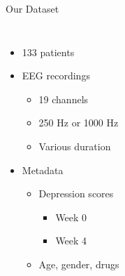 \documentclass{beamer}
\begin{document}

\begin{frame}{Our Dataset}
	\begin{columns}
        \begin{itemize}
            \item<2-> 133 patients
            \item<3-> EEG recordings
              \begin{itemize}
                \item 19 channels
                \item 250 Hz or 1000 Hz
                \item Various duration
              \end{itemize}
              \item<4-> Metadata
                  \begin{itemize}
                      \item Depression scores
                          \begin{itemize}
                              \item Week 0
                              \item Week 4
                          \end{itemize}
                       \item Age, gender, drugs
                  \end{itemize}
        \end{itemize}

\end{columns}
\end{frame}
\end{document}
